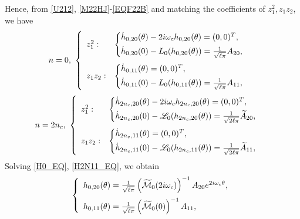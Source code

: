 \documentclass[11pt]{article}
\theoremstyle{definition}
\theoremstyle{remark}
\numberwithin{equation}{section}
\begin{document}
Hence, from \eqref{U212}, \eqref{M22HJ}-\eqref{EQF22B} and matching the
coefficients of $z_1^2, z_1z_2 $, we have
\begin{equation}
\label{H0_EQ}
n=0,~\left\{\begin{array}{ll}
z_1^2: &\begin{cases}
\dot{h}_{0,20}(\theta)-2i\omega_c h_{0,20}(\theta)=(0, 0)^T,\vspace{0.1cm}\\
\dot{h}_{0,20}(0)-L_0(h_{0,20}(\theta))=\frac{1}{\sqrt{\ell\pi}}A_{20},
\end{cases}
\vspace{0.2cm}\\
z_1z_2:&\begin{cases}
\dot{h}_{0,11}(\theta)=(0, 0)^T,\vspace{0.1cm}\\
\dot{h}_{0,11}(0)-L_0(h_{0,11}(\theta))=\frac{1}{\sqrt{\ell\pi}}A_{11},
\end{cases}
\end{array}
\right.
\end{equation}
\begin{equation}
\label{H2N11_EQ}
n=2n_c,
~\left\{\begin{array}{ll}
z_1^2: &\begin{cases}
\dot{h}_{2n_c,20}(\theta)-2i\omega_c h_{2n_c,20}(\theta)=(0, 0)^T,\vspace{0.1cm}\\
\dot{h}_{2n_c,20}(0)-\mathscr{L}_0(h_{2n_c,20}(\theta))=\frac{1}{\sqrt{2\ell\pi}}\widetilde{A}_{20},
\end{cases}\vspace{0.2cm}\\
z_1z_2:&\begin{cases}
\dot{h}_{2n_c,11}(\theta)=(0, 0)^T,\vspace{0.1cm}\\
\dot{h}_{2n_c,11}(0)-\mathscr{L}_0(h_{2n_c,11}(\theta))=\frac{1}{\sqrt{2\ell\pi}}\widetilde{A}_{11},
\end{cases}
\end{array}
\right.
\end{equation}
Solving \eqref{H0_EQ}, \eqref{H2N11_EQ}, we obtain
\begin{equation*}
\label{H0}
\left\{
\begin{array}{l}
h_{0,20}(\theta) =\frac{1}{\sqrt{\ell\pi}}\left(\widetilde{\mathcal{M}}_0(2i\omega_c)\right)^{-1}A_{20}e^{2i\omega_c\theta},\vspace{0.2cm}\\
h_{0,11}(\theta) =\frac{1}{\sqrt{\ell\pi}}\left(\widetilde{\mathcal{M}}_0(0)\right)^{-1}A_{11},
\end{array}
\right.
\end{equation*}
\end{document}
